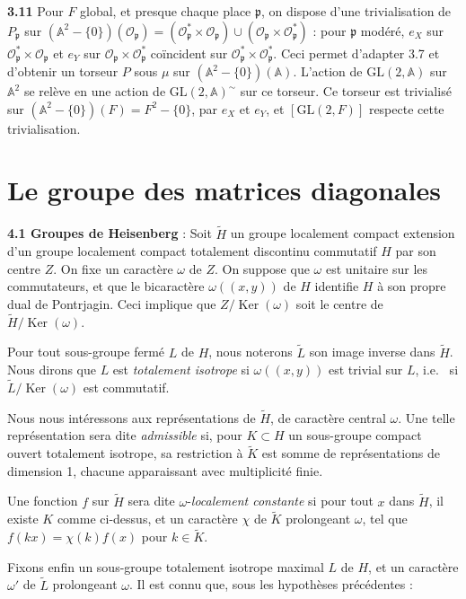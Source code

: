 \documentclass[12pt,a4paper]{article}
\theoremstyle{plain}
\theoremstyle{definition}
\theoremstyle{remark}
\DeclareMathOperator{\Ker}{Ker}
\newcommand{\Af}{\mathbb{A}}
\newcommand{\cO}{\mathcal{O}}
\newcommand{\frakp}{\mathfrak{p}}
\newcommand{\wt}{\widetilde}
\providecommand{\AA}{\mathbb{A}}
\providecommand{\cO}{\mathcal{O}}
\providecommand{\frakp}{\mathfrak{p}}
\providecommand{\Ker}{\operatorname{Ker}}
\begin{document}
\textbf{3.11} Pour $F$ global, et presque chaque place $\frakp$, on dispose d'une trivialisation de $P_\frakp$ sur $(\AA^2 - \{0\})(\cO_\frakp) = (\cO_\frakp^* \times \cO_\frakp) \cup (\cO_\frakp \times \cO_\frakp^*)$ : pour $\frakp$ modéré, $e_X$ sur $\cO_\frakp^* \times \cO_\frakp$ et $e_Y$ sur $\cO_\frakp \times \cO_\frakp^*$ coïncident sur $\cO_\frakp^* \times \cO_\frakp^*$. Ceci permet d'adapter 3.7 et d'obtenir un torseur $P$ sous $\mu$ sur $(\AA^2 - \{0\})(\Af)$. L'action de $\mathrm{GL}(2, \Af)$ sur $\Af^2$ se relève en une action de $\mathrm{GL}(2, \Af)^\sim$ sur ce torseur. Ce torseur est trivialisé sur $(\AA^2 - \{0\})(F) = F^2 - \{0\}$, par $e_X$ et $e_Y$, et $[\mathrm{GL}(2, F)]$ respecte cette trivialisation.

\section{Le groupe des matrices diagonales}

\textbf{4.1 Groupes de Heisenberg} : Soit $\wt{H}$ un groupe localement compact extension d'un groupe localement compact totalement discontinu commutatif $H$ par son centre $Z$. On fixe un caractère $\omega$ de $Z$. On suppose que $\omega$ est unitaire sur les commutateurs, et que le bicaractère $\omega((x, y))$ de $H$ identifie $H$ à son propre dual de Pontrjagin. Ceci implique que $Z / \Ker(\omega)$ soit le centre de $\wt{H} / \Ker(\omega)$.

Pour tout sous-groupe fermé $L$ de $H$, nous noterons $\wt{L}$ son image inverse dans $\wt{H}$. Nous dirons que $L$ est \emph{totalement isotrope} si $\omega((x, y))$ est trivial sur $L$, i.e.
\ si $\wt{L} / \Ker(\omega)$ est commutatif.

Nous nous intéressons aux représentations de $\wt{H}$, de caractère central $\omega$. Une telle représentation sera dite \emph{admissible} si, pour $K \subset H$ un sous-groupe compact ouvert totalement isotrope, sa restriction à $\wt{K}$ est somme de représentations de dimension 1, chacune apparaissant avec multiplicité finie.

Une fonction $f$ sur $\wt{H}$ sera dite $\omega$-\emph{localement constante} si pour tout $x$ dans $\wt{H}$, il existe $K$ comme ci-dessus, et un caractère $\chi$ de $\wt{K}$ prolongeant $\omega$, tel que $f(kx) = \chi(k) f(x)$ pour $k \in \wt{K}$.

Fixons enfin un sous-groupe totalement isotrope maximal $L$ de $H$, et un caractère $\omega'$ de $\wt{L}$ prolongeant $\omega$. Il est connu que, sous les hypothèses précédentes :
\end{document}
